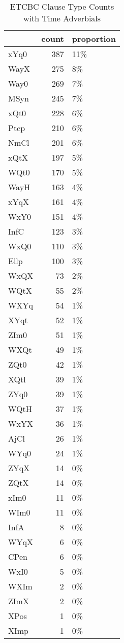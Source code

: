 \begin{table}[htbp!]
\centering
\caption{ETCBC Clause Type Counts with Time Adverbials}
\label{table:cltype_cts}
\begin{tabular}{lrl}
\toprule
{} &  count & proportion \\
\midrule
xYq0 &    387 &        11\% \\
WayX &    275 &         8\% \\
Way0 &    269 &         7\% \\
MSyn &    245 &         7\% \\
xQt0 &    228 &         6\% \\
Ptcp &    210 &         6\% \\
NmCl &    201 &         6\% \\
xQtX &    197 &         5\% \\
WQt0 &    170 &         5\% \\
WayH &    163 &         4\% \\
xYqX &    161 &         4\% \\
WxY0 &    151 &         4\% \\
InfC &    123 &         3\% \\
WxQ0 &    110 &         3\% \\
Ellp &    100 &         3\% \\
WxQX &     73 &         2\% \\
WQtX &     55 &         2\% \\
WXYq &     54 &         1\% \\
XYqt &     52 &         1\% \\
ZIm0 &     51 &         1\% \\
WXQt &     49 &         1\% \\
ZQt0 &     42 &         1\% \\
XQtl &     39 &         1\% \\
ZYq0 &     39 &         1\% \\
WQtH &     37 &         1\% \\
WxYX &     36 &         1\% \\
AjCl &     26 &         1\% \\
WYq0 &     24 &         1\% \\
ZYqX &     14 &         0\% \\
ZQtX &     14 &         0\% \\
xIm0 &     11 &         0\% \\
WIm0 &     11 &         0\% \\
InfA &      8 &         0\% \\
WYqX &      6 &         0\% \\
CPen &      6 &         0\% \\
WxI0 &      5 &         0\% \\
WXIm &      2 &         0\% \\
ZImX &      2 &         0\% \\
XPos &      1 &         0\% \\
XImp &      1 &         0\% \\
\bottomrule
\end{tabular}
\end{table}
